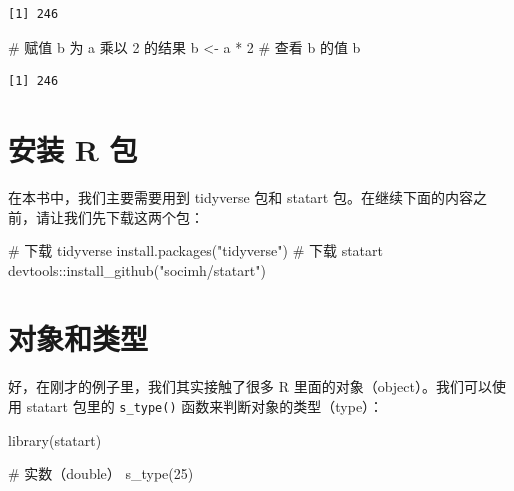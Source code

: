 \documentclass[
  letterpaper,
]{ctexbook}
\newenvironment{Shaded}{\begin{snugshade}}{\end{snugshade}}
\newcommand{\CommentTok}[1]{\textcolor[rgb]{0.37,0.37,0.37}{#1}}
\newcommand{\DecValTok}[1]{\textcolor[rgb]{0.68,0.00,0.00}{#1}}
\newcommand{\FunctionTok}[1]{\textcolor[rgb]{0.28,0.35,0.67}{#1}}
\newcommand{\NormalTok}[1]{\textcolor[rgb]{0.00,0.23,0.31}{#1}}
\newcommand{\OtherTok}[1]{\textcolor[rgb]{0.00,0.23,0.31}{#1}}
\newcommand{\SpecialCharTok}[1]{\textcolor[rgb]{0.37,0.37,0.37}{#1}}
\newcommand{\StringTok}[1]{\textcolor[rgb]{0.13,0.47,0.30}{#1}}
\begin{document}
\begin{verbatim}
[1] 246
\end{verbatim}

\begin{Shaded}
\begin{Highlighting}[]
\CommentTok{\# 赋值 b 为 a 乘以 2 的结果}
\NormalTok{b }\OtherTok{\textless{}{-}}\NormalTok{ a }\SpecialCharTok{*} \DecValTok{2}
\CommentTok{\# 查看 b 的值}
\NormalTok{b}
\end{Highlighting}
\end{Shaded}

\begin{verbatim}
[1] 246
\end{verbatim}

\hypertarget{ux5b89ux88c5-r-ux5305}{%
\section{安装 R 包}\label{ux5b89ux88c5-r-ux5305}}

在本书中，我们主要需要用到 tidyverse 包和 statart
包。在继续下面的内容之前，请让我们先下载这两个包：

\begin{Shaded}
\begin{Highlighting}[]
\CommentTok{\# 下载 tidyverse}
\FunctionTok{install.packages}\NormalTok{(}\StringTok{"tidyverse"}\NormalTok{)}
\CommentTok{\# 下载 statart}
\NormalTok{devtools}\SpecialCharTok{::}\FunctionTok{install\_github}\NormalTok{(}\StringTok{"socimh/statart"}\NormalTok{)}
\end{Highlighting}
\end{Shaded}

\hypertarget{ux5bf9ux8c61ux548cux7c7bux578b}{%
\section{对象和类型}\label{ux5bf9ux8c61ux548cux7c7bux578b}}

好，在刚才的例子里，我们其实接触了很多 R
里面的对象（object）。我们可以使用 statart 包里的 \texttt{s\_type()}
函数来判断对象的类型（type）：

\begin{Shaded}
\begin{Highlighting}[]
\FunctionTok{library}\NormalTok{(statart)}
\end{Highlighting}
\end{Shaded}

\begin{Shaded}
\begin{Highlighting}[]
\CommentTok{\# 实数（double）}
\FunctionTok{s\_type}\NormalTok{(}\DecValTok{25}\NormalTok{)}
\end{Highlighting}
\end{Shaded}
\end{document}
